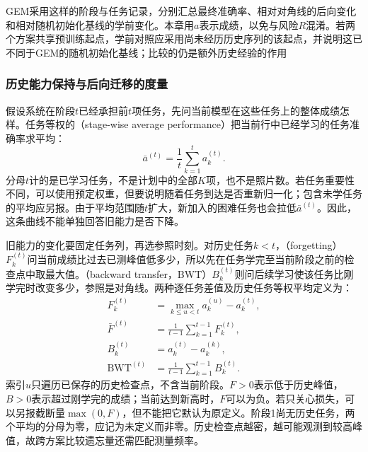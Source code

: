GEM采用这样的阶段与任务记录，分别汇总最终准确率、相对对角线的后向变化和相对随机初始化基线的学前变化。本章用$a$表示成绩，以免与风险$R$混淆。若两个方案共享预训练起点，学前对照应采用尚未经历历史序列的该起点，并说明这已不同于GEM的随机初始化基线；比较的仍是额外历史经验的作用

\subsubsection{历史能力保持与后向迁移的度量}
\label{sec:ket-evaluation-backward}

假设系统在阶段$t$已经承担前$t$项任务，先问当前模型在这些任务上的整体成绩怎样。任务等权的（stage-wise average performance）把当前行中已经学习的任务准确率求平均：
\begin{equation}
  \bar a^{(t)}=\frac1t\sum_{k=1}^{t}a_k^{(t)}.
  \label{eq:ket-evaluation-stage-average}
\end{equation}
分母$t$计的是已学习任务，不是计划中的全部$K$项，也不是照片数。若任务重要性不同，可以使用预定权重，但要说明随着任务到达是否重新归一化；包含未学任务的平均应另报。由于平均范围随$t$扩大，新加入的困难任务也会拉低$\bar a^{(t)}$。因此，这条曲线不能单独回答旧能力是否下降。

旧能力的变化要固定任务列，再选参照时刻。对历史任务$k<t$，（forgetting）$F_k^{(t)}$问当前成绩比过去已测峰值低多少，所以先在任务学完至当前阶段之前的检查点中取最大值。（backward transfer，BWT）$B_k^{(t)}$则问后续学习使该任务比刚学完时改变多少，参照是对角线。两种逐任务差值及历史任务等权平均定义为：
\begin{equation}
  \begin{aligned}
    F_k^{(t)}&=\max_{k\leq u<t}a_k^{(u)}-a_k^{(t)},\\
    \bar F^{(t)}&=\frac1{t-1}\sum_{k=1}^{t-1}F_k^{(t)},\\
    B_k^{(t)}&=a_k^{(t)}-a_k^{(k)},\\
    \operatorname{BWT}^{(t)}&=\frac1{t-1}\sum_{k=1}^{t-1}B_k^{(t)}.
  \end{aligned}
  \label{eq:ket-evaluation-forgetting-bwt}
\end{equation}
索引$u$只遍历已保存的历史检查点，不含当前阶段。$F>0$表示低于历史峰值，$B>0$表示超过刚学完的成绩；当前达到新高时，$F$可以为负。若只关心损失，可以另报截断量$\max(0,F)$，但不能把它默认为原定义。阶段1尚无历史任务，两个平均的分母为零，应记为未定义而非零。历史检查点越密，越可能观测到较高峰值，故跨方案比较遗忘量还需匹配测量频率。

